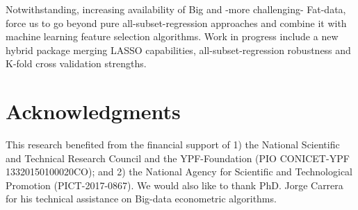 \documentclass{juliacon}
\begin{document}
Notwithstanding, increasing availability of Big and -more challenging- Fat-data, force us to go beyond pure all-subset-regression approaches and combine it with machine learning feature selection algorithms. Work in progress include a new hybrid package merging LASSO capabilities, all-subset-regression robustness and K-fold cross validation strengths.

\section{Acknowledgments}
\label{sec:ackno}
This research benefited from the financial support of 1) the National Scientific and Technical Research Council and the YPF-Foundation (PIO CONICET-YPF 13320150100020CO); and 2) the National Agency for Scientific and Technological Promotion (PICT-2017-0867). We would also like to thank PhD. Jorge Carrera for his technical assistance on Big-data econometric algorithms.



\end{document}
